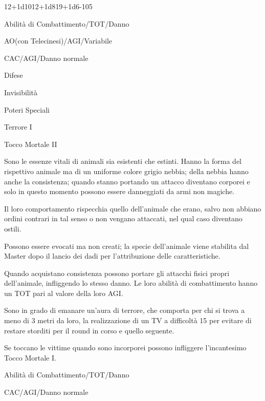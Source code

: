 {12+1d10}{12+1d8}{19+1d6}{-}{105}

\begin{parmostro}{Abilit\`a di Combattimento/TOT/Danno}
\item AO(con Telecinesi)/AGI/Variabile
\item CAC/AGI/Danno normale
\end{parmostro}

\begin{parmostro}{Difese}
\item Invisibilit\`a
\end{parmostro}

\begin{parmostro}{Poteri Speciali}
\item Terrore I
\item Tocco Mortale II
\end{parmostro}


Sono le essenze vitali di animali sia esistenti che estinti. Hanno la
forma del rispettivo animale ma di un uniforme colore grigio nebbia;
della nebbia hanno anche la consistenza; quando stanno portando un
attacco diventano corporei e solo in questo momento possono essere
danneggiati da armi non magiche.

Il loro comportamento rispecchia quello dell'animale che erano, salvo
non abbiano ordini contrari in tal senso o non vengano attaccati, nel
qual caso diventano ostili. 

Possono essere evocati ma non creati; la specie dell'animale viene
stabilita dal Master dopo il lancio dei dadi per l'attribuzione delle
caratteristiche.

Quando acquistano consistenza possono portare gli attacchi fisici
propri dell'animale, infliggendo lo stesso danno. Le loro abilit\`a
di combattimento hanno un TOT pari al valore della loro AGI.

Sono in grado di emanare un'aura di terrore, che comporta per chi
si trova a meno di 3 metri da loro, la realizzazione di un TV a
difficolt\`a 15 per evitare di restare storditi per il round in
corso e quello seguente.

Se toccano le vittime quando sono incorporei possono
infliggere l'incantesimo Tocco Mortale I. 


\begin{parmostro}{Abilit\`a di Combattimento/TOT/Danno}
\item CAC/AGI/Danno normale
\end{parmostro}

